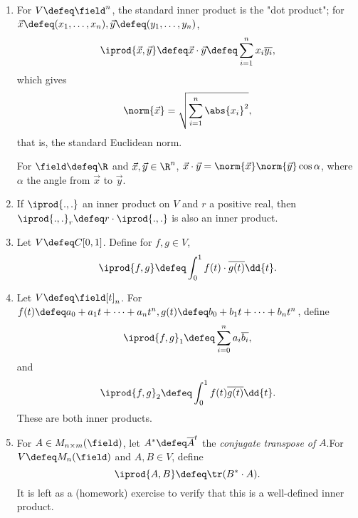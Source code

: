 \begin{example}
    \begin{enumerate}
   \item For $V \defeq \field^n$, the standard inner product is the "dot product"; for $\vec{x} \defeq (x_1, \dots, x_n), \vec{y} \defeq (y_1, \dots, y_n)$, \begin{align*}
            \iprod{\vec{x}, \vec{y}} \defeq \vec{x} \cdot \vec{y} \defeq \sum_{i=1}^n x_i \overline{y_i},
        \end{align*}
        which gives \begin{align*}
            \norm{\vec{x}} = \sqrt{\sum_{i=1}^n \abs{x_i}^2},
        \end{align*}
        that is, the standard Euclidean norm.
        \begin{proposition}
            For $\field \defeq \R$ and $\vec{x}, \vec{y} \in \R^n$, $\vec{x} \cdot \vec{y} = \norm{\vec{x}} \norm{\vec{y}} \cos \alpha$, where $\alpha$ the angle from $\vec{x}$ to $\vec{y}$.
        \end{proposition}
        \item If $\iprod{.,.}$ an inner product on $V$ and $r$ a positive real, then $\iprod{.,.}_r \defeq r \cdot \iprod{.,.}$ is also an inner product.
        \item Let $V \defeq C[0,1]$. Define for $f, g \in V$, \[
        \iprod{f, g}    \defeq \int_0^1 f(t) \cdot \overline{g(t)} \dd{t}.
        \]
        \item Let $V \defeq \field[t]_n$. For $f(t) \defeq a_0 + a_1 t + \cdots + a_n t^n, g(t) \defeq b_0 + b_1 t + \cdots + b_n t^n$, define \begin{align*}
            \iprod{f, g}_1 \defeq \sum_{i=0}^n a_i \overline{b_i},
        \end{align*}
        and \begin{align*}
            \iprod{f, g}_2 \defeq \int_0^1 f(t) \overline{g(t)} \dd{t}.
        \end{align*}
        These are both inner products.
        \item For $A \in M_{n \times m}(\field)$, let $A^\ast \defeq \overline{A}^t$ the \emph{conjugate transpose of} $A$.\footnotemark  For $V \defeq M_n(\field)$ and $A, B \in V$, define \[
        \iprod{A, B} \defeq \tr(B^\ast \cdot A).
        \]
        It is left as a (homework) exercise to verify that this is a well-defined inner product.
    \end{enumerate}
\end{example}


